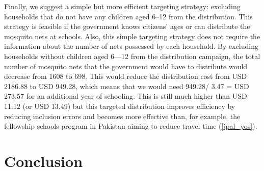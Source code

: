 \documentclass[fleqn,11pt]{article}
\begin{document}
Finally, we suggest a simple but more efficient targeting strategy: excluding households that do not have any children aged 6--12 from the distribution. This strategy is feasible if the government knows citizens' ages or can distribute the mosquito nets at schools. Also, this simple targeting strategy does not require the information about the number of nets possessed by each household.  By excluding households without children aged 6—12 from the distribution campaign, the total number of mosquito nets that the government would have to distribute would decrease from 1608 to 698. This would reduce the distribution cost from USD 2186.88 to USD 949.28, which means that we would need 949.28/ 3.47 = USD 273.57 for an additional year of schooling. This is still much higher than USD 11.12 (or USD 13.49) but this targeted distribution improves efficiency by reducing inclusion errors and becomes more effective than, for example, the fellowship schools program in Pakistan aiming to reduce travel time (\autoref{jpal_yos}).  




\section{Conclusion}

\label{Feb 12 18:00:13 2013}
\end{document}
